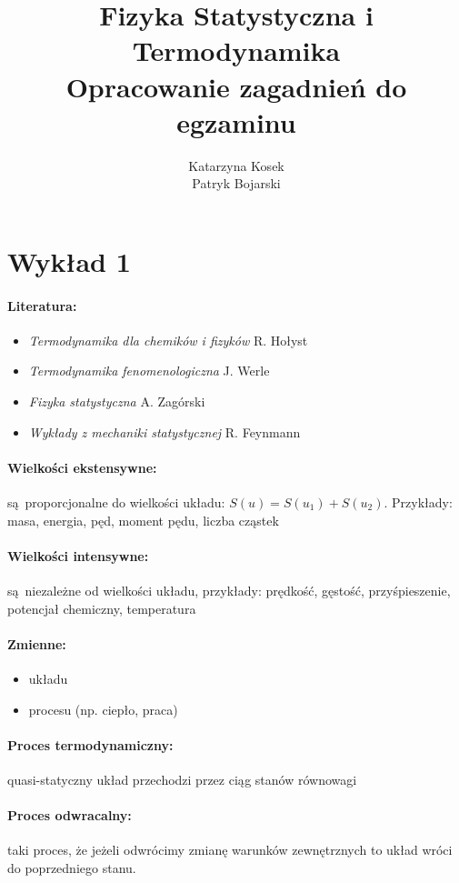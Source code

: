 \documentclass{article}
\title{Fizyka Statystyczna i Termodynamika \\ Opracowanie zagadnień do egzaminu}
\author{Katarzyna Kosek \\ Patryk Bojarski}
\begin{document}
	\maketitle
	\newpage
	\section{Wykład 1}
		\paragraph{Literatura:}
			\begin{itemize}
				\item \textit{Termodynamika dla chemików i fizyków} R. Hołyst
				\item \textit{Termodynamika fenomenologiczna} J. Werle
				\item \textit{Fizyka statystyczna} A. Zagórski
				\item \textit{Wykłady z mechaniki statystycznej} R. Feynmann
			\end{itemize}
		\paragraph{Wielkości ekstensywne:} są proporcjonalne do wielkości układu: $S(u) = S(u_1) + S(u_2)$. Przykłady: masa, energia, pęd, moment pędu, liczba cząstek
		\paragraph{Wielkości intensywne:} są niezależne od wielkości układu, przykłady: prędkość, gęstość, przyśpieszenie, potencjał chemiczny, temperatura
		\paragraph{Zmienne: }
			\begin{itemize}
				\item układu
				\item procesu (np. ciepło, praca)
			\end{itemize}
		\paragraph{Proces termodynamiczny:} quasi-statyczny układ przechodzi przez ciąg stanów równowagi
		\paragraph{Proces odwracalny:} taki proces, że jeżeli odwrócimy zmianę warunków zewnętrznych to układ wróci do poprzedniego stanu.
\end{document}
